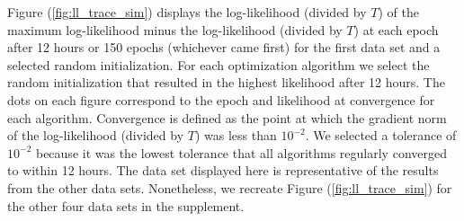 Figure (\ref{fig:ll_trace_sim}) displays the log-likelihood (divided by $T$) of the maximum log-likelihood minus the log-likelihood (divided by $T$) at each epoch after 12 hours or 150 epochs (whichever came first) for the first data set and a selected random initialization. For each optimization algorithm we select the random initialization that resulted in the highest likelihood after 12 hours. The dots on each figure correspond to the epoch and likelihood at convergence for each algorithm. Convergence is defined as the point at which the gradient norm of the log-likelihood (divided by $T$) was less than $10^{-2}$. We selected a tolerance of $10^{-2}$ because it was the lowest tolerance that all algorithms regularly converged to within 12 hours. 
The data set displayed here is representative of the results from the other data sets. Nonetheless, we recreate Figure (\ref{fig:ll_trace_sim}) for the other four data sets in the supplement.
%
